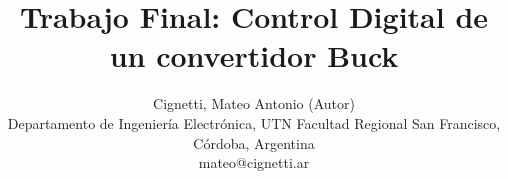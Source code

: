 \documentclass[10pt, a4paper, fleqn]{article}
\title{
    \centering \fontsize{24pt}{14pt}\selectfont \textbf{Trabajo Final: Control Digital de un convertidor Buck}
}
\author{
    \centering \fontsize{12pt}{14pt}\selectfont Cignetti, Mateo Antonio (Autor)\\
    \normalsize Departamento de Ingeniería Electrónica, UTN Facultad Regional San Francisco, Córdoba, Argentina \\
    mateo@cignetti.ar
    \vspace{0.5cm} %
}
\date{}
\begin{document}
    \maketitle
    \thispagestyle{fancy}

    
    

    
    
    
    

    \newpage
    \renewcommand{\refname}{\large REFERENCIAS}
    \begin{minipage}{0.96\textwidth}
    \printbibliography
    \end{minipage}
\end{document}

